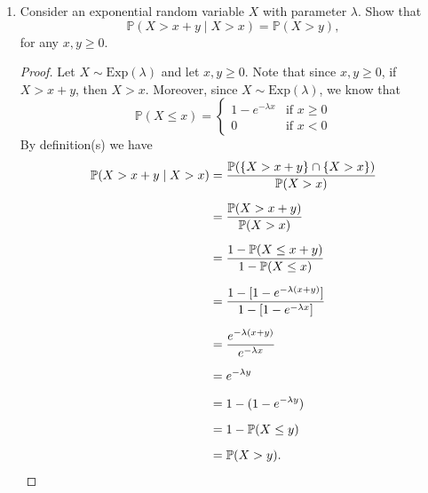 \documentclass[11pt,oneside,english]{amsart}
\theoremstyle{definition}
\newcommand{\1}{\mathbbm{1}}
\newcommand{\p}{\mathbb{P}}
\begin{document}
\begin{enumerate}[leftmargin=*]
\vfill
\pagebreak





\item Consider an exponential random variable $X$ with parameter $\lambda$. Show that
\[
\p(X>x+y\mid X>x)=\p(X>y),
\]
for any $x,y\geq0$.

\begin{proof}
Let $X\sim\text{Exp}(\lambda)$ and let $x,y\geq0$. Note that since $x,y\geq0$, if $X>x+y$, then $X>x$. Moreover, since $X\sim\text{Exp}(\lambda)$, we know that
\[
\p(X\leq x)=\begin{cases} 1-e^{-\lambda x} & \text{if }x\geq0 \\ 0 & \text{if }x<0\end{cases}
\]
By definition(s) we have
\begin{align*}
\p(X>x+y\mid X>x)&=\frac{\p(\{X>x+y\}\cap\{X>x\})}{\p(X>x)}\\[2mm]
&=\frac{\p(X>x+y)}{\p(X>x)}\\[2mm]
&=\frac{1-\p(X\leq x+y)}{1-\p(X\leq x)}\\[2mm]
&=\frac{1-[1-e^{-\lambda (x+y)}]}{1-[1-e^{-\lambda x}]}\\[2mm]
&=\frac{e^{-\lambda (x+y)}}{e^{-\lambda x}}\\[2mm]
&=e^{-\lambda y}\\[2mm]
&=1-(1-e^{-\lambda y})\\[2mm]
&=1-\p(X\leq y)\\[2mm]
&=\p(X>y).\qedhere
\end{align*}

\end{proof}



\end{enumerate}
\end{document}
